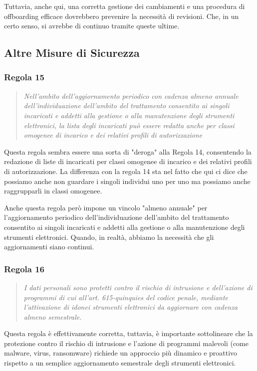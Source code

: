 Tuttavia, anche qui, una corretta gestione dei cambiamenti e una procedura di offboarding efficace dovrebbero prevenire la necessità di revisioni. Che, in un certo senso, si avrebbe di continuo tramite queste ultime.
\subsection{Altre Misure di Sicurezza}
\subsubsection*{Regola 15}
\begin{quote}
    \textit{Nell'ambito dell'aggiornamento periodico con cadenza almeno annuale dell'individuazione dell'ambito del trattamento consentito ai singoli incaricati e addetti alla gestione o alla manutenzione degli strumenti elettronici, la lista degli incaricati può essere redatta anche per classi omogenee di incarico e dei relativi profili di autorizzazione}
\end{quote}

Questa regola sembra essere una sorta di "deroga" alla Regola 14, consentendo la redazione di liste di incaricati per classi omogenee di incarico e dei relativi profili di autorizzazione. La differenza con la regola 14 sta nel fatto che qui ci dice che possiamo anche non guardare i singoli individui uno per uno ma possiamo anche raggrupparli in classi omogenee.

Anche questa regola però impone un vincolo "almeno annuale" per l'aggiornamento periodico dell'individuazione dell'ambito del trattamento consentito ai singoli incaricati e addetti alla gestione o alla manutenzione degli strumenti elettronici. Quando, in realtà, abbiamo la necessità che gli aggiornamenti siano continui.

\subsubsection*{Regola 16}
\begin{quote}
    \textit{I dati personali sono protetti contro il rischio di intrusione e dell'azione di programmi di cui all'art. 615-quinquies del codice penale, mediante l'attivazione di idonei strumenti elettronici da aggiornare con cadenza almeno semestrale.}
\end{quote}

Questa regola è effettivamente corretta, tuttavia, è importante sottolineare che la protezione contro il rischio di intrusione e l'azione di programmi malevoli (come malware, virus, ransomware) richiede un approccio più dinamico e proattivo rispetto a un semplice aggiornamento semestrale degli strumenti elettronici.

